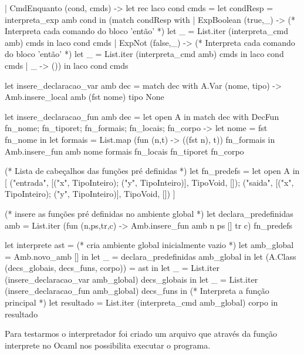 \documentclass[12pt,a4paper,twoside]{report}
\begin{document}
\begin{terminal}
    | CmdEnquanto (cond, cmds) ->
        let rec laco cond cmds =
          let condResp = interpreta_exp amb cond in
                (match condResp with
                  | ExpBoolean (true,_) ->
                      (* Interpreta cada comando do bloco 'então' *)
                      let _ = List.iter (interpreta_cmd amb) cmds in
                        laco cond cmds
          | ExpNot (false,_) ->
                      (* Interpreta cada comando do bloco 'então' *)
                      let _ = List.iter (interpreta_cmd amb) cmds in
                        laco cond cmds
                  | _ -> ())
        in laco cond cmds

let insere_declaracao_var amb dec =
    match dec with
        A.Var (nome, tipo) ->  Amb.insere_local amb (fst nome) tipo None

let insere_declaracao_fun amb dec =
  let open A in
    match dec with
      DecFun {fn_nome; fn_tiporet; fn_formais; fn_locais; fn_corpo} ->
        let nome = fst fn_nome in
        let formais = List.map (fun (n,t) -> ((fst n), t)) fn_formais in
        Amb.insere_fun amb nome formais fn_locais fn_tiporet fn_corpo


(* Lista de cabeçalhos das funções pré definidas *)
let fn_predefs = let open A in [
   ("entrada", [("x", TipoInteiro); ("y", TipoInteiro)], TipoVoid, []);
   ("saida",   [("x", TipoInteiro); ("y", TipoInteiro)], TipoVoid, [])
]

(* insere as funções pré definidas no ambiente global *)
let declara_predefinidas amb =
  List.iter (fun (n,ps,tr,c) -> Amb.insere_fun amb n ps [] tr c) fn_predefs

let interprete ast =
  (* cria ambiente global inicialmente vazio *)
  let amb_global = Amb.novo_amb [] in
  let _ = declara_predefinidas amb_global in
  let (A.Class (decs_globais, decs_funs, corpo)) = ast in
  let _ = List.iter (insere_declaracao_var amb_global) decs_globais in
  let _ = List.iter (insere_declaracao_fun amb_global) decs_funs in
  (* Interpreta a função principal *)
  let resultado = List.iter (interpreta_cmd amb_global) corpo in
  resultado


\end{terminal}
Para testarmos o interpretador foi criado um arquivo que através da função interprete no Ocaml nos possibilita executar o programa.
\end{document}
